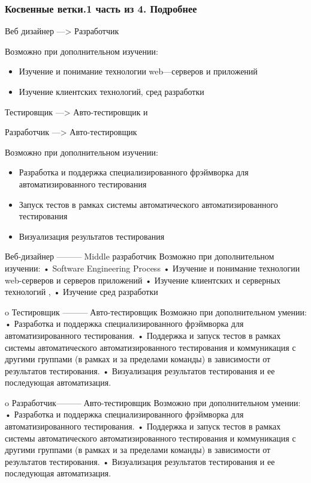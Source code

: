 \documentclass{../industrial-development}
\begin{document}
\begin{frame} \frametitle{Косвенные ветки.1 часть из 4. Подробнее}

\begin{block}{Веб дизайнер ---> Разработчик}

Возможно при дополнительном изучении:
  \end{block}
\begin{itemize}
  \item Изучение и понимание технологии web---серверов и приложений
  \item Изучение клиентских технологий, сред разработки
  \end{itemize}

 \begin{block}{Тестировщик ---> Авто-тестировщик        и 

Разработчик ---> Авто-тестировщик }

Возможно при дополнительном изучении:
  \end{block}
\begin{itemize}
  \item Разработка и поддержка специализированного фрэймворка для автоматизированного тестирования
  \item Запуск тестов в рамках системы автоматического автоматизированного тестирования
\item Визуализация результатов тестирования
  \end{itemize}
\end{frame}

\lecturenotes

Веб-дизайнер ---------Middle разработчик
Возможно при дополнительном изучении:
•	Software Engineering Process
•	 Изучение и понимание технологии web-серверов и серверов приложений
•	Изучение клиентских и серверных технологий , 
•	Изучение сред разработки


o	Тестировщик ---------Авто-тестировщик
Возможно при дополнительном умении:
•	Разработка и поддержка специализированного фрэймворка для автоматизированного тестирования.
•	Поддержка и запуск тестов в рамках системы автоматического автоматизированного тестирования и коммуникация с другими группами (в рамках и за пределами команды) в зависимости от результатов тестирования.
•	Визуализация результатов тестирования и ее последующая автоматизация.


o	Разработчик---------Авто-тестировщик
Возможно при дополнительном умении:
•	Разработка и поддержка специализированного фрэймворка для автоматизированного тестирования.
•	Поддержка и запуск тестов в рамках системы автоматического автоматизированного тестирования и коммуникация с другими группами (в рамках и за пределами команды) в зависимости от результатов тестирования.
•	Визуализация результатов тестирования и ее последующая автоматизация.
\end{document}
